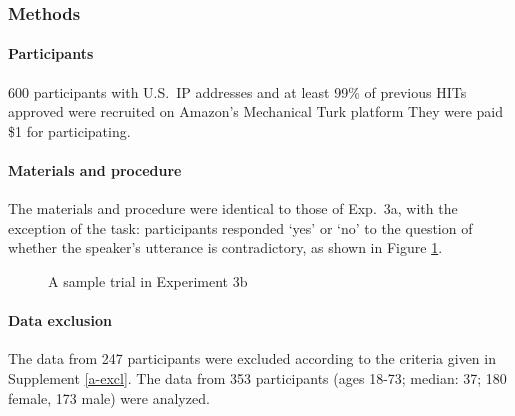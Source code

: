 \documentclass[11pt,fleqn]{article}
\newcommand{\6}{\mbox{$[\hspace*{-.6mm}[$}}
\newcommand{\9}{\mbox{$]\hspace*{-.6mm}]$}}
\begin{document}
{\subsubsection{Methods}

\paragraph{Participants} 600 participants with U.S.\ IP addresses and at least 99\% of previous HITs approved were recruited on Amazon's Mechanical Turk platform They were paid \$1 for participating.

\paragraph{Materials and procedure} The materials and procedure were identical to those of Exp.~3a, with the exception of the task: participants responded `yes' or `no' to the question of whether the speaker's utterance is contradictory, as shown in Figure \ref{fig-trial-exp3b}.

\begin{figure}[h!]
\begin{center}
\end{center}
\caption{A sample trial in Experiment 3b}\label{fig-trial-exp3b}
\end{figure}


\paragraph{Data exclusion} The data from 247 participants were excluded according to the criteria given in Supplement \ref{a-excl}. The data from 353 participants (ages 18-73; median: 37; 180 female, 173 male) were analyzed.
    


}
\end{document}
